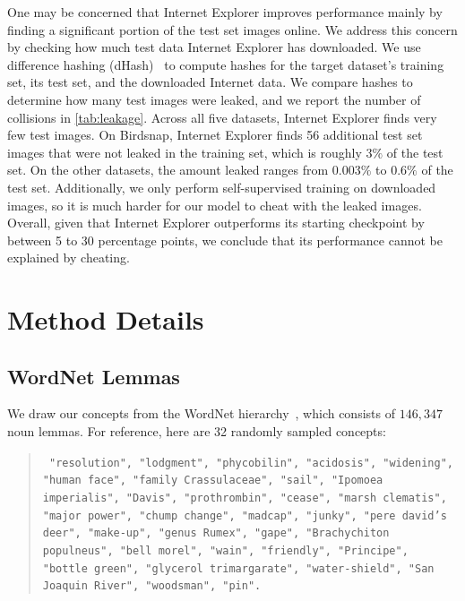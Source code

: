 One may be concerned that Internet Explorer improves performance mainly by finding a significant portion of the test set images online. We address this concern by checking how much test data Internet Explorer has downloaded. We use difference hashing (dHash)~\cite{imagehash} to compute hashes for the target dataset's training set, its test set, and the downloaded Internet data. We compare hashes to determine how many test images were leaked, and we report the number of collisions in \cref{tab:leakage}. Across all five datasets, Internet Explorer finds very few test images. On Birdsnap, Internet Explorer finds 56 additional test set images that were not leaked in the training set, which is roughly $3\%$ of the test set. On the other datasets, the amount leaked ranges from $0.003\%$ to $0.6\%$ of the test set. Additionally, we only perform self-supervised training on downloaded images, so it is much harder for our model to cheat with the leaked images. Overall, given that Internet Explorer outperforms its starting checkpoint by between 5 to 30 percentage points, we conclude that its performance cannot be explained by cheating. 

\section{Method Details}


\subsection{WordNet Lemmas}
\label{sec:wordnet_lemmas}
We draw our concepts from the WordNet hierarchy~\cite{miller1995wordnet}, which consists of $146{,}347$ noun lemmas. For reference, here are 32 randomly sampled concepts:
\begin{quote}
{\tt { 
"resolution",
"lodgment",
"phycobilin",
"acidosis",
"widening",
"human face",
"family Crassulaceae",
"sail",
"Ipomoea imperialis",
"Davis",
"prothrombin",
"cease",
"marsh clematis",
"major power",
"chump change",
"madcap",
"junky",
"pere david's deer",
"make-up",
"genus Rumex",
"gape",
"Brachychiton populneus",
"bell morel",
"wain",
"friendly",
"Principe",
"bottle green",
"glycerol trimargarate",
"water-shield",
"San Joaquin River",
"woodsman",
"pin".
}}
\end{quote}

